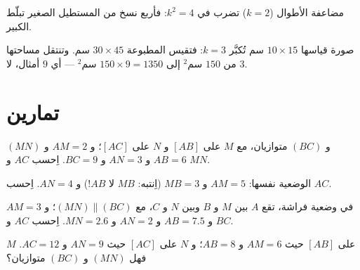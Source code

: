 \begin{omfigure}

{\small مضاعفة الأطوال ($k = 2$) تضرب  في
$k^2 = 4$: فأربع نسخ من المستطيل الصغير تبلّط الكبير.}
\end{omfigure}

\begin{example}
صورة قياسها $10 \times 15$ سم تُكبَّر  $k = 3$:
فتقيس المطبوعة $30 \times 45$ سم. وتنتقل مساحتها من $150$ سم$^2$
إلى $150 \times 9 = 1350$ سم$^2$ --- أي $9$ أمثال، لا $3$.
\end{example}

\section{تمارين}

\begin{exercise}[$\star$]\label{exo:g9:thales:1}
 $(MN)$ و $(BC)$ متوازيان، مع $M$ على $[AB]$ و $N$
على $[AC]$؛ و $AM = 2$ و $AB = 6$ و $AN = 3$ و $BC = 9$. اِحسب $AC$ و $MN$.
\end{exercise}

\begin{exercise}[$\star$]\label{exo:g9:thales:2}
الوضعية نفسها: $AM = 5$ و $MB = 3$ (اِنتبه: $MB$ لا $AB$!)
و $AN = 4$. اِحسب $AC$.
\end{exercise}

\begin{exercise}[$\star$]\label{exo:g9:thales:3}
في وضعية فراشة، تقع $A$ بين $M$ و $B$ وبين $N$ و $C$، مع
$(MN) \parallel (BC)$؛ و $AM = 3$ و $AB = 7.5$ و $AN = 2$
و $MN = 2.6$. اِحسب $AC$ و $BC$.
\end{exercise}

\begin{exercise}[$\star$]\label{exo:g9:thales:4}
$M$ على $[AB]$ حيث $AM = 6$ و $AB = 8$؛ و $N$ على $[AC]$ حيث $AN = 9$
و $AC = 12$. فهل  $(MN)$ و $(BC)$ متوازيان؟
\end{exercise}

